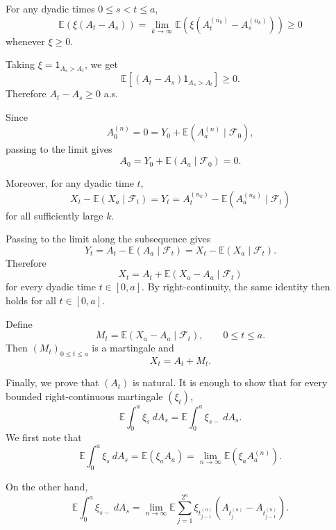 {    For any dyadic times $0 \leq s < t \leq a$,
    $$
        \mathbb{E}(\xi (A_t - A_s)) = \lim_{k \to \infty}\mathbb{E}(\xi (A_t^{(n_k)} - A_s^{(n_k)})) \geq 0
    $$
    whenever $\xi \geq 0$.

    Taking $\xi = \mathsf{1}_{A_s > A_t}$, we get
    $$
        \mathbb{E}\left[ (A_t - A_s) \mathsf{1}_{A_s > A_t} \right] \geq 0.
    $$
    Therefore $A_t - A_s \geq 0$ a.s.

    Since
    $$
        A_0^{(n)} = 0 = Y_0 + \mathbb{E}(A_a^{(n)} \mid \mathcal{F}_0),
    $$
    passing to the limit gives
    $$
        A_0 = Y_0 + \mathbb{E}(A_a \mid \mathcal{F}_0) = 0.
    $$

    Moreover, for any dyadic time $t$,
    $$
        X_t - \mathbb{E}(X_a \mid \mathcal{F}_t) = Y_t = A_t^{(n_k)} - \mathbb{E}(A_a^{(n_k)} \mid \mathcal{F}_t)
    $$
    for all sufficiently large $k$.

    Passing to the limit along the subsequence gives
    $$
        Y_t = A_t - \mathbb{E}(A_a \mid \mathcal{F}_t) = X_t - \mathbb{E}(X_a \mid \mathcal{F}_t).
    $$
    Therefore
    $$
        X_t = A_t + \mathbb{E}(X_a - A_a \mid \mathcal{F}_t)
    $$
    for every dyadic time $t \in [0,a]$. By right-continuity, the same identity then holds for all $t \in [0,a]$.

    Define
    $$
        M_t = \mathbb{E}(X_a - A_a \mid \mathcal{F}_t), \qquad 0 \leq t \leq a.
    $$
    Then $(M_t)_{0 \leq t \leq a}$ is a martingale and
    $$
        X_t = A_t + M_t.
    $$

    Finally, we prove that $(A_t)$ is natural. It is enough to show that for every bounded right-continuous martingale $(\xi_t)$,
    $$
        \mathbb{E}\int_{0}^{a} \xi_s ~dA_s = \mathbb{E}\int_{0}^{a}\xi_{s-}~dA_s.
    $$
    We first note that
    $$
        \mathbb{E}\int_{0}^{a} \xi_s ~dA_s = \mathbb{E}(\xi_a A_a) = \lim_{n \to \infty}\mathbb{E}(\xi_a A_a^{(n)}).
    $$

    On the other hand,
    $$
        \mathbb{E}\int_{0}^{a}\xi_{s-}~dA_s
        = \lim_{n \to \infty} \mathbb{E} \sum_{j=1}^{2^n}\xi_{t_{j-1}^{(n)}}(A_{t_{j}^{(n)}} - A_{t_{j-1}^{(n)}}).
    $$

}
